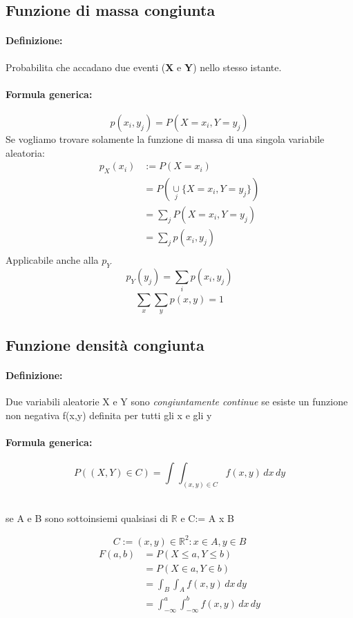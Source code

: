 \documentclass[]{article}
\newcommand{\definizione}{\paragraph{Definizione:}}
\newcommand{\formula}{\paragraph{Formula generica:}}
\begin{document}
    \subsection{Funzione di massa congiunta}
    \definizione Probabilita che accadano due eventi (\textbf{X} e \textbf{Y}) nello stesso istante.
    \formula \[ p(x_i, y_j) = P(X=x_i, Y=y_j) \]
    Se vogliamo trovare solamente la funzione di massa di una singola variabile aleatoria:
    \begin{equation*}
        \begin{split}
            p_X(x_i) & := P(X = x_i) \\ 
            & = P(\underset{j}{\cup} \{ X=x_i, Y=y_j \}) \\
            & = \sum_{j}^{} P(X=x_i, Y=y_j) \\ 
            & = \sum_{j}^{} p(x_i, y_j) \\
        \end{split}
    \end{equation*}
    Applicabile anche alla $p_Y$
    \[ p_Y(y_j) = \sum_{i}^{} p(x_i, y_j) \]
    \linebreak[4]
    \[ \sum_{x}^{} \sum_{y}^{} p(x, y) = 1 \]

    \newpage
    \subsection{Funzione densità congiunta}
    \definizione Due variabili aleatorie X e Y sono \textit{congiuntamente continue} se esiste un funzione non negativa f(x,y)
    definita per tutti gli x e gli y
    \formula
    \[ P((X,Y) \in C) = \int_{}^{} \int_{(x,y) \in C}^{} f(x,y) \, dx \, dy \] \\
    \centerline{se A e B sono sottoinsiemi qualsiasi di $\mathbb{R}$ e C:= A x B}
    \[ C:= {(x,y) \in \mathbb{R}^2 : x \in A, y \in B}\]
    \begin{equation*}
        \begin{split}
            F(a,b) & = P(X \leq a, Y \leq b) \\
            & = P(X \in a, Y \in b) \\
            & = \int_{B}^{} \int_{A}^{} f(x,y) \, dx \, dy \\
            & = \int_{-\infty}^{a} \int_{-\infty}^{b} f(x,y) \, dx \, dy \\
        \end{split}
    \end{equation*}
\end{document}
